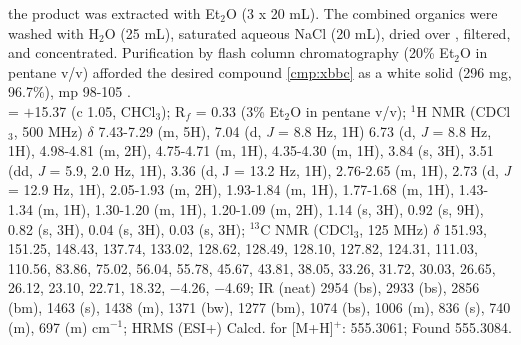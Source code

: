 the product was extracted with Et$_2$O (3 x 20 mL). The combined organics were washed with H$_2$O
(25 mL), saturated aqueous NaCl (20 mL), dried over , filtered, and concentrated.
Purification by flash column chromatography (20\% Et$_2$O in pentane v/v) afforded the
desired compound \ref{cmp:xbbc} as a white solid (296 mg, 96.7\%), mp 98-105 \degc. \\
\rotation = $+$15.37 (c 1.05, CHCl$_3$); R$_f$ = 0.33 (3\% Et$_2$O in pentane v/v); $^1$H NMR (CDCl$_3$, 500
MHz) $\delta$ 7.43-7.29 (m, 5H), 7.04 (d, \textit{J} = 8.8 Hz, 1H) 6.73 (d, \textit{J} = 8.8 Hz, 1H), 4.98-4.81 (m, 2H),
4.75-4.71 (m, 1H), 4.35-4.30 (m, 1H), 3.84 (s, 3H), 3.51 (dd, \textit{J} = 5.9, 2.0 Hz, 1H), 3.36 (d, J =
13.2 Hz, 1H), 2.76-2.65 (m, 1H), 2.73 (d, \textit{J} = 12.9 Hz, 1H), 2.05-1.93 (m, 2H), 1.93-1.84 (m,
1H), 1.77-1.68 (m, 1H), 1.43-1.34 (m, 1H), 1.30-1.20 (m, 1H), 1.20-1.09 (m, 2H), 1.14 (s, 3H),
0.92 (s, 9H), 0.82 (s, 3H), 0.04 (s, 3H), 0.03 (s, 3H); $^{13}$C NMR (CDCl$_3$, 125 MHz) $\delta$ 151.93,
151.25, 148.43, 137.74, 133.02, 128.62, 128.49, 128.10, 127.82, 124.31, 111.03, 110.56, 83.86,
75.02, 56.04, 55.78, 45.67, 43.81, 38.05, 33.26, 31.72, 30.03, 26.65, 26.12, 23.10, 22.71, 18.32, $-$4.26, $-$4.69; IR (neat) 2954 (bs), 2933 (bs), 2856 (bm), 1463 (s), 1438 (m), 1371 (bw), 1277 (bm),
1074 (bs), 1006 (m), 836 (s), 740 (m), 697 (m) cm$^{-1}$; HRMS (ESI+) Calcd. for
 [M+H]$^+$: 555.3061; Found 555.3084.

